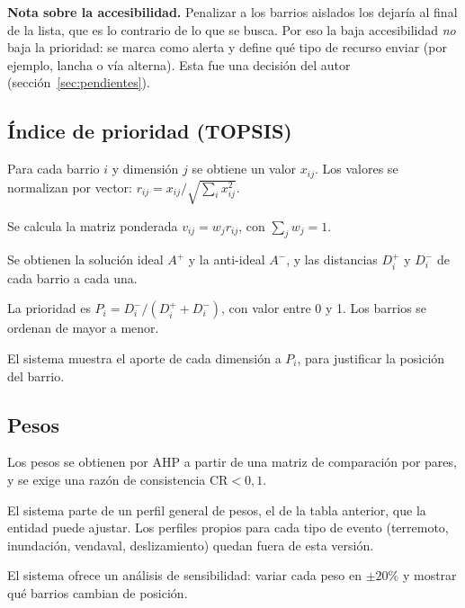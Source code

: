 \textbf{Nota sobre la accesibilidad.} Penalizar a los barrios aislados los dejaría al final de la lista, que es lo contrario de lo que se busca. Por eso la baja accesibilidad \emph{no} baja la prioridad: se marca como alerta y define qué tipo de recurso enviar (por ejemplo, lancha o vía alterna). Esta fue una decisión del autor (sección~\ref{sec:pendientes}).

\subsection{Índice de prioridad (TOPSIS)}\label{sec:topsis}
\begin{description}[leftmargin=0pt]
  \item[RM-01 (\Must).] Para cada barrio $i$ y dimensión $j$ se obtiene un valor $x_{ij}$. Los valores se normalizan por vector: $r_{ij}=x_{ij}/\sqrt{\sum_i x_{ij}^2}$.
  \item[RM-02 (\Must).] Se calcula la matriz ponderada $v_{ij}=w_j r_{ij}$, con $\sum_j w_j=1$.
  \item[RM-03 (\Must).] Se obtienen la solución ideal $A^+$ y la anti-ideal $A^-$, y las distancias $D_i^+$ y $D_i^-$ de cada barrio a cada una.
  \item[RM-04 (\Must).] La prioridad es $P_i = D_i^-/(D_i^+ + D_i^-)$, con valor entre 0 y 1. Los barrios se ordenan de mayor a menor.
  \item[RM-05 (\Must).] El sistema muestra el aporte de cada dimensión a $P_i$, para justificar la posición del barrio.
\end{description}

\subsection{Pesos}
\begin{description}[leftmargin=0pt]
  \item[RM-06 (\Must).] Los pesos se obtienen por AHP a partir de una matriz de comparación por pares, y se exige una razón de consistencia $\text{CR}<0{,}1$.
  \item[RM-07 (\Must).] El sistema parte de un perfil general de pesos, el de la tabla anterior, que la entidad puede ajustar. Los perfiles propios para cada tipo de evento (terremoto, inundación, vendaval, deslizamiento) quedan fuera de esta versión.
  \item[RM-08 (\Should).] El sistema ofrece un análisis de sensibilidad: variar cada peso en $\pm 20\%$ y mostrar qué barrios cambian de posición.
\end{description}

